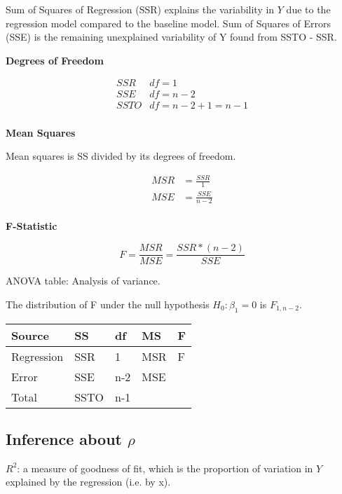 \documentclass[10pt]{article}
\newcommand{\hlDef}[1]{\colorbox{Thistle2}{#1}}
\begin{document}
\begin{multicols}{3}
    Sum of Squares of Regression (SSR) explains the variability in $Y$ due to the regression model compared to the baseline model.
    Sum of Squares of Errors (SSE) is the remaining unexplained variability of Y found from SSTO - SSR.

    \textbf{Degrees of Freedom}

    \begin{align*}
        SSR  & df = 1                 \\
        SSE  & df = n - 2             \\
        SSTO & df = n - 2 + 1 = n - 1 \\
    \end{align*}

    \textbf{Mean Squares}

    Mean squares is SS divided by its degrees of freedom.

    \begin{align}
        MSR & = \frac{SSR}{1}   \\
        MSE & = \frac{SSE}{n-2} \\
    \end{align}

    \textbf{F-Statistic}

    \begin{equation}\label{eq: f stat}
        F = \frac{MSR}{MSE} = \frac{SSR * (n-2)}{SSE}
    \end{equation}

    \hlDef{ANOVA table}: Analysis of variance.

    The distribution of F under the null hypothesis $H_0: \beta_1 = 0$ is $F_{1, n-2}$.

    \begin{tabular}{l l l l l}
        Source     & SS   & df  & MS  & F \\ \hline
        Regression & SSR  & 1   & MSR & F \\
        Error      & SSE  & n-2 & MSE &   \\
        Total      & SSTO & n-1 &     &   \\
    \end{tabular}

    \subsection[Inference about correlation]{Inference about $\rho$}

    \hlDef{$R^2$}: a measure of goodness of fit, which is the proportion of variation in $Y$ explained by the regression (i.e. by x).


\end{multicols}
\end{document}
